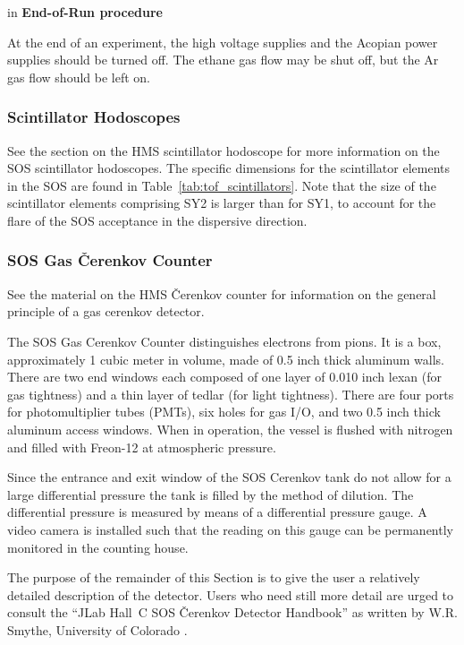  in
{\bf End-of-Run procedure}

At the end of an experiment, the high voltage supplies and the Acopian
power supplies should be turned off.  The ethane gas flow may be shut
off, but the Ar gas flow should be left on.


\subsubsection{Scintillator Hodoscopes }

See the section on the HMS scintillator hodoscope for more information on the SOS scintillator hodoscopes.  The specific dimensions for the scintillator elements in the SOS
are found in Table~\ref{tab:tof_scintillators}.
Note that the size of the scintillator elements
comprising SY2 is larger than for SY1, to account for the flare of the
SOS acceptance in the dispersive direction.

\subsubsection{SOS Gas \v{C}erenkov Counter}

See the material on the HMS \v{C}erenkov counter for information on the general 
principle of a gas cerenkov detector.

The SOS Gas Cerenkov Counter distinguishes electrons from pions.  It
is a box, approximately 1 cubic meter in volume, made of 0.5 inch
thick aluminum walls.  There are two end windows each composed of one
layer of 0.010 inch lexan (for gas tightness) and a thin layer of
tedlar (for light tightness).  There are four ports for
photomultiplier tubes (PMTs), six holes for gas I/O, and two 0.5 inch
thick aluminum access windows.  When in operation, the vessel is
flushed with nitrogen and filled with Freon-12 at atmospheric
pressure.

Since the entrance and exit window of the
SOS Cerenkov tank do not allow for a large differential pressure the
tank is filled by the method of dilution.
The differential pressure is measured by means of a differential
pressure gauge.
A video camera is installed such that the reading on this gauge can be
permanently monitored in the counting house.

	The purpose of the remainder of this Section is to give the user
a relatively detailed description of the detector.  Users who need still more
detail are urged to consult the ``JLab Hall~C SOS \v{C}erenkov
Detector Handbook'' as written by W.R. Smythe, University of Colorado
\cite{bi:Smythe}.

